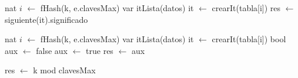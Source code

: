 \begin{algorithm}[H]
\begin{algorithmic}[1]
 
  \State nat $i$ $\gets$ fHash(k, e.clavesMax) 
  \State var itLista(datos) it $\gets$ crearIt(tabla[i])
    \State res $\gets$ siguiente(it).significado
  \EndIf
  \EndWhile
\EndFunction
\end{algorithmic}
\end{algorithm}



\begin{algorithm}[H]
\begin{algorithmic}[1]
 
  \State nat $i$ $\gets$ fHash(k, e.clavesMax) 
  \State var itLista(datos) it $\gets$ crearIt(tabla[i])
  \State bool aux $\gets$ false
    \State aux $\gets$ true
  \EndIf
  \EndWhile
  \State res $\gets$ aux
\EndFunction
\end{algorithmic}
\end{algorithm}

\begin{algorithm}[H]
\begin{algorithmic}[1]
 
  \State res $\gets$ k mod clavesMax 
\EndFunction
\end{algorithmic}
\end{algorithm}


\newpage
\disServiciosUsados
\vspace*{-1em}
